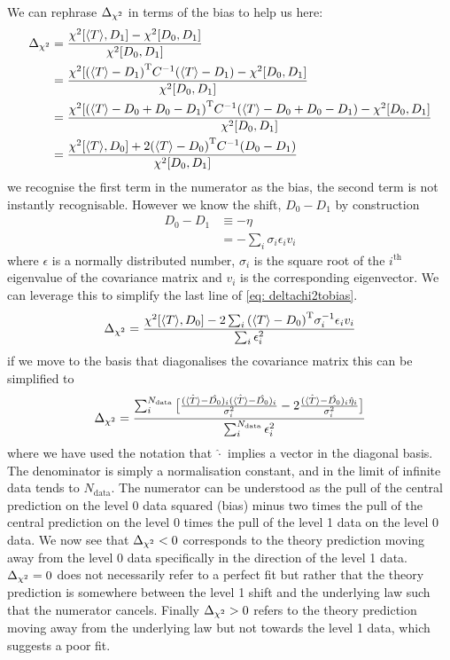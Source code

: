 We can rephrase $\Delta_{\chi^{2}}$ in terms of the bias to help us here:
%
\begin{equation}
    \begin{split}
        \Delta_{\chi^{2}} &= \frac{\chi^{2}[\langle T \rangle, D_{1}] - \chi^{2}[D_{0}, D_{1}]}{\chi^{2}[D_{0}, D_{1}]} \\
        &= \frac{\chi^{2}[{(\langle T \rangle - D_{1})}^{\mathrm{T}} C^{-1} (\langle T \rangle - D_{1}) - \chi^{2}[D_{0}, D_{1}]}{\chi^{2}[D_{0}, D_{1}]} \\
        &= \frac{\chi^{2}[{(\langle T \rangle - D_{0} + D_{0} - D_{1})}^{\mathrm{T}} C^{-1} (\langle T \rangle - D_{0} + D_{0} -D_{1}) - \chi^{2}[D_{0}, D_{1}]}{\chi^{2}[D_{0}, D_{1}]} \\
        &= \frac{ \chi^{2}[\langle T \rangle, D_{0}] + 2 {(\langle T \rangle - D_{0})}^{\mathrm{T}} C^{-1} (D_{0} - D_{1}) }{\chi^{2}[D_{0}, D_{1}]}
    \end{split}
    \label{eq: deltachi2tobias}
\end{equation}
%
we recognise the first term in the numerator as the bias, the second term is not
instantly recognisable. However we know the shift, $D_{0} - D_{1}$ by construction
%
\begin{equation}
    \begin{split}
        D_{0} - D_{1} &\equiv - \eta \\
        &= - \sum_{i} \sigma_{i} \epsilon_{i} v_{i}
    \end{split}
\end{equation}
%
where $\epsilon$ is a normally distributed number, $\sigma_{i}$ is the square
root of the $i^{\mathrm{th}}$ eigenvalue of the covariance matrix and $v_{i}$ is
the corresponding eigenvector. We can leverage this to simplify the last line of
\eqref{eq: deltachi2tobias}.
%
\begin{equation}
    \Delta_{\chi^{2}} = \frac{ \chi^{2}[\langle T \rangle, D_{0}] - 2 \sum_{i} {(\langle T \rangle - D_{0})}^{\mathrm{T}} \sigma_{i}^{-1} \epsilon_{i} v_{i} }{ \sum_{i} \epsilon_{i}^{2} }
\end{equation}
%
if we move to the basis that diagonalises the covariance matrix this can be simplified to
%
\begin{equation}
    \Delta_{\chi^{2}} = \frac{ \sum_{i}^{N_{\mathrm{data}}} \big[ 
        \frac{(\hat{\langle T \rangle} - \hat{D_{0}})_{i} (\hat{\langle T \rangle} - \hat{D_{0}})_{i}}{\sigma_{i}^{2}} -
        2 \frac{(\hat{\langle T \rangle} - \hat{D_{0}})_{i} \hat{\eta}_{i}}{\sigma_{i}^{2}} \big] }{
            \sum_{i}^{N_{\mathrm{data}}} \epsilon_{i}^{2} }
\end{equation}
%
where we have used the notation that $\hat{\cdot}$ implies a vector in the
diagonal basis. The denominator is simply a normalisation constant, and in the
limit of infinite data tends to $N_{\mathrm{data}}$. The numerator can be
understood as the pull of the central prediction on the level 0 data squared
(bias) minus two times the pull of the central prediction on the level 0 times
the pull of the level 1 data on the level 0 data. We now see that $\Delta_{\chi^{2}} < 0$
corresponds to the theory prediction moving away from the level 0 data
specifically in the direction of the level 1 data. $\Delta_{\chi^{2}} = 0$ does not
necessarily refer to a perfect fit but rather that the theory prediction is
somewhere between the level 1 shift and the underlying law such that the
numerator cancels. Finally $\Delta_{\chi^{2}} > 0$ refers to the theory prediction moving
away from the underlying law but not towards the level 1 data, which suggests a
poor fit. 

